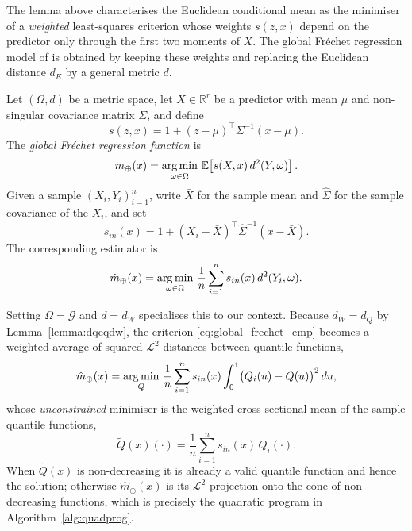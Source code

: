 \begin{postsub}
The lemma above characterises the Euclidean conditional mean as the minimiser of a
\emph{weighted} least-squares criterion whose weights $s(z, x)$ depend on the predictor
only through the first two moments of $X$. The global Fréchet regression model of
\textcite{PetersenMüller2019} is obtained by keeping these weights and replacing the
Euclidean distance $d_E$ by a general metric $d$.
\begin{definition}
    \label{def:global_frechet}
    Let $(\Omega, d)$ be a metric space, let $X \in \mathbb{R}^r$ be a predictor with mean
    $\mu$ and non-singular covariance matrix $\Sigma$, and define
    \[
        s(z, x) = 1 + (z - \mu)^\top \Sigma^{-1} (x - \mu).
    \]
    The \emph{global Fréchet regression function} is
    \begin{equation}
        \label{eq:global_frechet_pop}
        m_\oplus(x) = \operatorname*{arg\,min}_{\omega \in \Omega}\,
        \mathbb{E}\!\left[ s(X, x)\, d^2(Y, \omega) \right].
    \end{equation}
    Given a sample $(X_i, Y_i)_{i=1}^n$, write $\bar{X}$ for the sample mean and
    $\hat{\Sigma}$ for the sample covariance of the $X_i$, and set
    \[
        s_{in}(x) = 1 + (X_i - \bar{X})^\top \hat{\Sigma}^{-1} (x - \bar{X}).
    \]
    The corresponding estimator is
    \begin{equation}
        \label{eq:global_frechet_emp}
        \hat{m}_\oplus(x) = \operatorname*{arg\,min}_{\omega \in \Omega}\,
        \frac{1}{n} \sum_{i=1}^{n} s_{in}(x)\, d^2(Y_i, \omega).
    \end{equation}
\end{definition}
Setting $\Omega = \mathcal{G}$ and $d = d_W$ specialises this to our context. Because
$d_W = d_Q$ by Lemma~\ref{lemma:dqeqdw}, the criterion \eqref{eq:global_frechet_emp}
becomes a weighted average of squared $\mathcal{L}^2$ distances between quantile
functions,
\begin{equation}
    \label{eq:frechet_qf_objective}
    \hat{m}_\oplus(x) = \operatorname*{arg\,min}_{Q}\,
    \frac{1}{n} \sum_{i=1}^{n} s_{in}(x) \int_0^1 \bigl(Q_i(u) - Q(u)\bigr)^2 \, du,
\end{equation}
whose \emph{unconstrained} minimiser is the weighted cross-sectional mean of the sample
quantile functions,
\[
    \tilde{Q}(x)(\cdot) = \frac{1}{n} \sum_{i=1}^{n} s_{in}(x)\, Q_i(\cdot).
\]
When $\tilde{Q}(x)$ is non-decreasing it is already a valid quantile function and hence the
solution; otherwise $\hat{m}_\oplus(x)$ is its $\mathcal{L}^2$-projection onto the cone of
non-decreasing functions, which is precisely the quadratic program in
Algorithm~\ref{alg:quadprog}.
\end{postsub}
